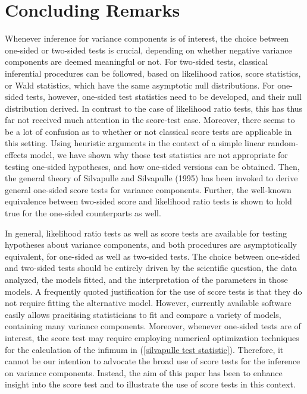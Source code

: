 \documentclass[useAMS,usenatbib,referee]{biom}
\begin{document}
\section{Concluding Remarks \label{concluding remarks}}

Whenever inference for variance components is of interest, the choice
between one-sided or two-sided tests is crucial, depending on whether
negative variance components are deemed meaningful or not. For
two-sided tests, classical inferential procedures can be followed,
based on likelihood ratios, score statistics, or Wald statistics,
which have the same asymptotic null distributions.  For one-sided
tests, however, one-sided test statistics need to be developed, and
their null distribution derived. In contrast to the case of likelihood
ratio tests, this has thus far not received much attention in the
score-test case. Moreover, there seems to be a lot of confusion as to
whether or not classical score tests are applicable in this
setting. Using heuristic arguments in the context of a simple linear
random-effects model, we have shown why those test statistics are not
appropriate for testing one-sided hypotheses, and how one-sided
versions can be obtained. Then, the general theory of Silvapulle and
Silvapulle (1995) has been invoked to derive general one-sided score
tests for variance components. Further, the well-known equivalence
between two-sided score and likelihood ratio tests is shown to hold
true for the one-sided counterparts as well.

In general, likelihood ratio tests as well as score tests are
available for testing hypotheses about variance components, and both
procedures are asymptotically equivalent, for one-sided as well as
two-sided tests. The choice between one-sided and two-sided tests
should be entirely driven by the scientific question, the data
analyzed, the models fitted, and the interpretation of the parameters
in those models. A frequently quoted justification for the use of
score tests is that they do not require fitting the alternative
model. However, currently available software easily allows pracitising
statisticians to fit and compare a variety of models, containing many
variance components. Moreover, whenever one-sided tests are of
interest, the score test may require employing numerical optimization
techniques for the calculation of the infimum in (\ref{silvapulle test
statistic}). Therefore, it cannot be our intention to advocate the
broad use of score tests for the inference on variance
components. Instead, the aim of this paper has been to enhance insight
into the score test and to illustrate the use of score tests in this
context.
\end{document}
